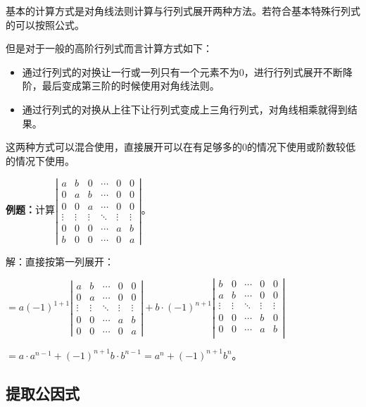 \documentclass[UTF8, 12pt]{ctexart}
\begin{document}
基本的计算方式是对角线法则计算与行列式展开两种方法。若符合基本特殊行列式的可以按照公式。

但是对于一般的高阶行列式而言计算方式如下：

\begin{itemize}
    \item 通过行列式的对换让一行或一列只有一个元素不为0，进行行列式展开不断降阶，最后变成第三阶的时候使用对角线法则。
    \item 通过行列式的对换从上往下让行列式变成上三角行列式，对角线相乘就得到结果。
\end{itemize}

这两种方式可以混合使用，直接展开可以在有足够多的0的情况下使用或阶数较低的情况下使用。\medskip

\textbf{例题：}计算$\left|\begin{array}{cccccc} 
    a & b & 0 & \cdots & 0 & 0 \\
    0 & a & b & \cdots & 0 & 0 \\
    0 & 0 & a & \cdots & 0 & 0 \\
    \vdots & \vdots & \vdots & \ddots & \vdots & \vdots \\
    0 & 0 & 0 & \cdots & a & b \\
    b & 0 & 0 & \cdots & 0 & a
\end{array}\right|$。

解：直接按第一列展开：

$=a(-1)^{1+1}\left|\begin{array}{ccccc} 
    a & b & \cdots & 0 & 0 \\
    0 & a & \cdots & 0 & 0 \\
    \vdots & \vdots & \ddots & \vdots & \vdots \\
    0 & 0 & \cdots & a & b \\
    0 & 0 & \cdots & 0 & a
\end{array}\right|+b\cdot(-1)^{n+1}\left|\begin{array}{ccccc} 
    b & 0 & \cdots & 0 & 0 \\
    a & b & \cdots & 0 & 0 \\
    \vdots & \vdots & \ddots & \vdots & \vdots \\
    0 & 0 & \cdots & b & 0 \\
    0 & 0 & \cdots & a & b \\
\end{array}\right|$

$=a\cdot a^{n-1}+(-1)^{n+1}b\cdot b^{n-1}=a^n+(-1)^{n+1}b^n$。

\subsection{提取公因式}
\end{document}
